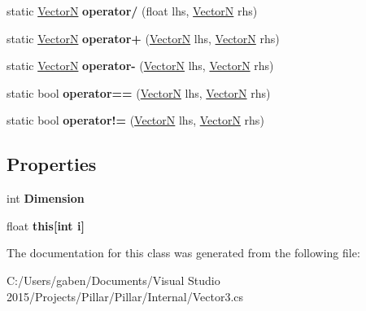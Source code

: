 \begin{DoxyCompactItemize}
static \hyperlink{class_pillar3_d_1_1_vector_n}{VectorN} {\bfseries operator/} (float lhs, \hyperlink{class_pillar3_d_1_1_vector_n}{VectorN} rhs)
\item 
\mbox{\label{class_pillar3_d_1_1_vector_n_ac153bb2b726415b7d7d4ab8634dea3a8}} 
static \hyperlink{class_pillar3_d_1_1_vector_n}{VectorN} {\bfseries operator+} (\hyperlink{class_pillar3_d_1_1_vector_n}{VectorN} lhs, \hyperlink{class_pillar3_d_1_1_vector_n}{VectorN} rhs)
\item 
\mbox{\label{class_pillar3_d_1_1_vector_n_a57f2f0bcc2ede6da09a9e4b2d3400cec}} 
static \hyperlink{class_pillar3_d_1_1_vector_n}{VectorN} {\bfseries operator-\/} (\hyperlink{class_pillar3_d_1_1_vector_n}{VectorN} lhs, \hyperlink{class_pillar3_d_1_1_vector_n}{VectorN} rhs)
\item 
\mbox{\label{class_pillar3_d_1_1_vector_n_ae9191d514dc4a39e2697b0e35b94d51f}} 
static bool {\bfseries operator==} (\hyperlink{class_pillar3_d_1_1_vector_n}{VectorN} lhs, \hyperlink{class_pillar3_d_1_1_vector_n}{VectorN} rhs)
\item 
\mbox{\label{class_pillar3_d_1_1_vector_n_af09186943caceb54b82d63315953acd9}} 
static bool {\bfseries operator!=} (\hyperlink{class_pillar3_d_1_1_vector_n}{VectorN} lhs, \hyperlink{class_pillar3_d_1_1_vector_n}{VectorN} rhs)
\end{DoxyCompactItemize}
\subsection*{Properties}
\begin{DoxyCompactItemize}
\item 
\mbox{\label{class_pillar3_d_1_1_vector_n_af24ba0ae6d51fbc85300fcabb4a51102}} 
int {\bfseries Dimension}
\item 
\mbox{\label{class_pillar3_d_1_1_vector_n_abef4e0c42410558c1f427e53dd1d5c28}} 
float {\bfseries this\mbox{[}int i\mbox{]}}
\end{DoxyCompactItemize}


The documentation for this class was generated from the following file\+:\begin{DoxyCompactItemize}
\item 
C\+:/\+Users/gaben/\+Documents/\+Visual Studio 2015/\+Projects/\+Pillar/\+Pillar/\+Internal/Vector3.\+cs\end{DoxyCompactItemize}
